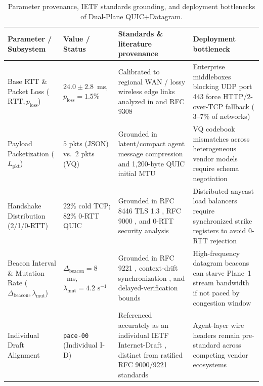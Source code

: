 \documentclass[11pt]{article}
\begin{document}
\begin{table}[ht]
\centering
\small
\caption{Parameter provenance, IETF standards grounding, and deployment bottlenecks of Dual-Plane QUIC+Datagram.}
\label{tab:readiness}
\begin{tabularx}{\textwidth}{@{}P{2.5cm}P{2.05cm}YY@{}}
\toprule
Parameter / Subsystem & Value / Status & Standards \& literature provenance & Deployment bottleneck \\
\midrule
Base RTT \& Packet Loss ($\mathrm{RTT},\allowbreak p_{\mathrm{loss}}$) & $24.0 \pm 2.8$~ms, $p_{\mathrm{loss}} = 1.5\%$ & Calibrated to regional WAN / lossy wireless edge links analyzed in \citet{langley2017quic} and RFC 9308 \citep{kuehlewind2022rfc9308} & Enterprise middleboxes blocking UDP port 443 force HTTP/2-over-TCP fallback ($3\text{--}7\%$ of networks)\\
Payload Packetization ($L_{\mathrm{pkt}}$) & $5$ pkts (JSON) vs.\ $2$ pkts (VQ) & Grounded in latent/compact agent message compression \citep{arxiv2511_20639, zhang2025agentprune} and 1{,}200-byte QUIC initial MTU \citep{iyengar2021rfc9000} & VQ codebook mismatches across heterogeneous vendor models require schema negotiation\\
Handshake Distribution (2/1/0-RTT) & $22\%$ cold TCP; $82\%$ 0-RTT QUIC & Grounded in RFC 8446 TLS 1.3 \citep{rescorla2018rfc8446}, RFC 9000 \citep{iyengar2021rfc9000}, and 0-RTT security analysis \citep{fischlin2024quic} & Distributed anycast load balancers require synchronized strike registers to avoid 0-RTT rejection\\
Beacon Interval \& Mutation Rate ($\Delta_{\mathrm{beacon}},\allowbreak \lambda_{\mathrm{mut}}$) & $\Delta_{\mathrm{beacon}} = 8$~ms, $\lambda_{\mathrm{mut}} = 4.2\text{ s}^{-1}$ & Grounded in RFC 9221 \citep{pauly2022rfc9221}, context-drift synchronization \citep{rodrigues2026drift}, and delayed-verification bounds \citep{itkin2026delayed} & High-frequency datagram beacons can starve Plane~1 stream bandwidth if not paced by congestion window\\
Individual Draft Alignment & \texttt{pace-00} (Individual I-D) & Referenced accurately as an individual IETF Internet-Draft \citep{nandakumar2026pace}, distinct from ratified RFC 9000/9221 standards & Agent-layer wire headers remain pre-standard across competing vendor ecosystems \\
\bottomrule\end{tabularx}
\end{table}

\end{document}
